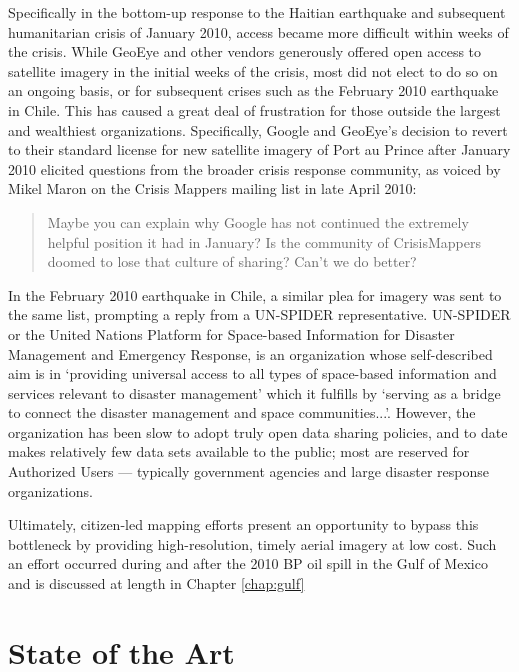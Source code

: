 \documentclass[11pt]{report}
\begin{document}

Specifically in the bottom-up response to the Haitian earthquake and subsequent humanitarian crisis of January 2010, access became more difficult within weeks of the crisis. While GeoEye and other vendors generously offered open access to satellite imagery in the initial weeks of the crisis, most did not elect to do so on an ongoing basis, or for subsequent crises such as the February 2010 earthquake in Chile. This has caused a great deal of frustration for those outside the largest and wealthiest organizations. Specifically, Google and GeoEye's decision to revert to their standard license for new satellite imagery of Port au Prince after January 2010 elicited questions from the broader crisis response community, as voiced by Mikel Maron on the Crisis Mappers mailing list in late April 2010:

\begin{quote}
Maybe you can explain why Google has not continued the extremely helpful position it had in January?
Is the community of CrisisMappers doomed to lose that culture of sharing? Can't we do better?
\end{quote}

In the February 2010 earthquake in Chile, a similar plea for imagery was sent to the same list, prompting a reply from a UN-SPIDER representative. UN-SPIDER or the United Nations Platform for Space-based Information for Disaster Management and Emergency Response, is an organization whose self-described aim is in `providing universal access to all types of space-based information and services relevant to disaster management' which it fulfills by `serving as a bridge to connect the disaster management and space communities...'\cite{unspider2010aims}. However, the organization has been slow to adopt truly open data sharing policies, and to date makes relatively few data sets available to the public; most are reserved for Authorized Users --- typically government agencies and large disaster response organizations.\cite{charter2010brochure}  

Ultimately, citizen-led mapping efforts present an opportunity to bypass this bottleneck by providing high-resolution, timely aerial imagery at low cost. Such an effort occurred during and after the 2010 BP oil spill in the Gulf of Mexico and is discussed at length in Chapter \ref{chap:gulf} 


\chapter{State of the Art}
\end{document}
